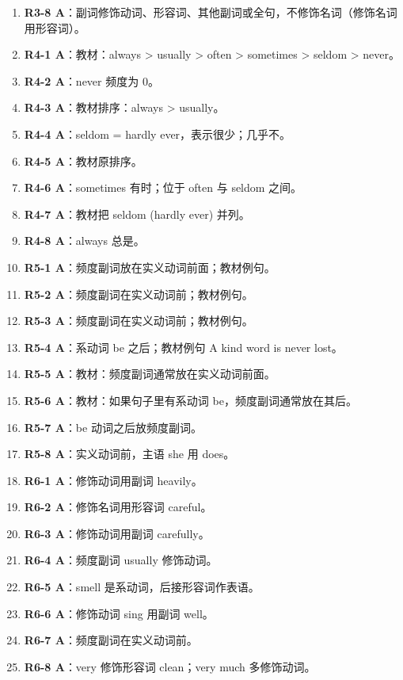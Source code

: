 \documentclass[11pt,a4paper]{ctexart}
\begin{document}
\begin{enumerate}[leftmargin=1.6em,itemsep=2pt]
\item \textbf{R3-8 A}：副词修饰动词、形容词、其他副词或全句，不修饰名词（修饰名词用形容词）。
\item \textbf{R4-1 A}：教材：always > usually > often > sometimes > seldom > never。
\item \textbf{R4-2 A}：never 频度为 0。
\item \textbf{R4-3 A}：教材排序：always > usually。
\item \textbf{R4-4 A}：seldom = hardly ever，表示很少；几乎不。
\item \textbf{R4-5 A}：教材原排序。
\item \textbf{R4-6 A}：sometimes 有时；位于 often 与 seldom 之间。
\item \textbf{R4-7 A}：教材把 seldom (hardly ever) 并列。
\item \textbf{R4-8 A}：always 总是。
\item \textbf{R5-1 A}：频度副词放在实义动词前面；教材例句。
\item \textbf{R5-2 A}：频度副词在实义动词前；教材例句。
\item \textbf{R5-3 A}：频度副词在实义动词前；教材例句。
\item \textbf{R5-4 A}：系动词 be 之后；教材例句 A kind word is never lost。
\item \textbf{R5-5 A}：教材：频度副词通常放在实义动词前面。
\item \textbf{R5-6 A}：教材：如果句子里有系动词 be，频度副词通常放在其后。
\item \textbf{R5-7 A}：be 动词之后放频度副词。
\item \textbf{R5-8 A}：实义动词前，主语 she 用 does。
\item \textbf{R6-1 A}：修饰动词用副词 heavily。
\item \textbf{R6-2 A}：修饰名词用形容词 careful。
\item \textbf{R6-3 A}：修饰动词用副词 carefully。
\item \textbf{R6-4 A}：频度副词 usually 修饰动词。
\item \textbf{R6-5 A}：smell 是系动词，后接形容词作表语。
\item \textbf{R6-6 A}：修饰动词 sing 用副词 well。
\item \textbf{R6-7 A}：频度副词在实义动词前。
\item \textbf{R6-8 A}：very 修饰形容词 clean；very much 多修饰动词。
\end{enumerate}
\end{document}
